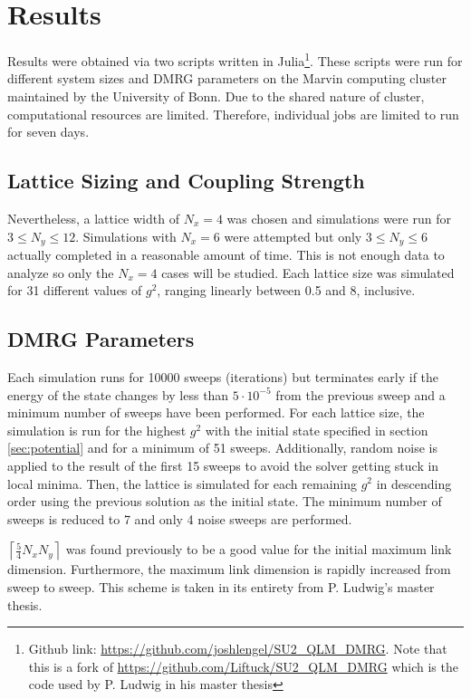 \documentclass[a4paper,oneside, 11pt,english,listof=totoc,bibliography=totoc]{scrbook}
\begin{document}
\chapter{Results}
Results were obtained via two scripts written in Julia\footnote{Github link: \url{https://github.com/joshlengel/SU2_QLM_DMRG}. Note that this is a fork of \url{https://github.com/Liftuck/SU2_QLM_DMRG} which is the code used by P. Ludwig in his master thesis\cite{PLudwig}}. These scripts were run for different system sizes and DMRG parameters on the Marvin computing cluster maintained by the University of Bonn. Due to the shared nature of cluster, computational resources are limited. Therefore, individual jobs are limited to run for seven days.

\section{Lattice Sizing and Coupling Strength}
Nevertheless, a lattice width of $N_x=4$ was chosen and simulations were run for $3\leq N_y\leq 12$. Simulations with $N_x=6$ were attempted but only $3\leq N_y\leq 6$ actually completed in a reasonable amount of time. This is not enough data to analyze so only the $N_x=4$ cases will be studied. Each lattice size was simulated for 31 different values of $g^2$, ranging linearly between 0.5 and 8, inclusive.

\section{DMRG Parameters}
Each simulation runs for 10000 sweeps (iterations) but terminates early if the energy of the state changes by less than $5\cdot 10^{-5}$ from the previous sweep and a minimum number of sweeps have been performed. For each lattice size, the simulation is run for the highest $g^2$ with the initial state specified in section \ref{sec:potential} and for a minimum of 51 sweeps. Additionally, random noise is applied to the result of the first 15 sweeps to avoid the solver getting stuck in local minima. Then, the lattice is simulated for each remaining $g^2$ in descending order using the previous solution as the initial state. The minimum number of sweeps is reduced to 7 and only 4 noise sweeps are performed.

$\left\lceil \frac{5}{4}N_xN_y\right\rceil$ was found previously to be a good value for the initial maximum link dimension. Furthermore, the maximum link dimension is rapidly increased from sweep to sweep. This scheme is taken in its entirety from P. Ludwig's master thesis\cite{PLudwig}.
\end{document}
